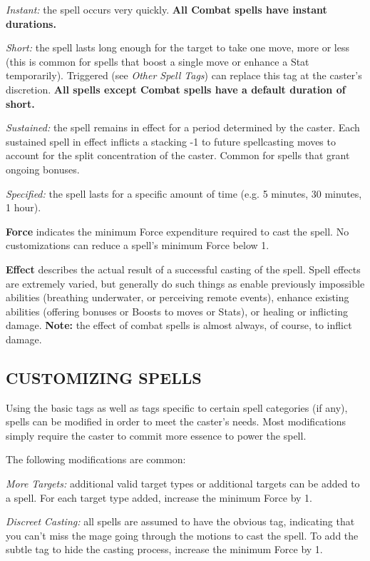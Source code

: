 \documentclass[oneside,10pt]{article}
\begin{document}
\begin{multicols}{2}
\begin{adjustwidth*}{.5cm}{.5cm}
\textit{Instant:} the spell occurs very quickly. \textbf{All Combat spells
have instant durations.}

\textit{Short:} the spell lasts long enough for the target to take one
move, more or less (this is common for spells that boost a
single move or enhance a Stat temporarily). Triggered (see
\textit{Other Spell Tags}) can replace this tag at the caster’s discretion. \textbf{All spells except Combat spells have a default
duration of short.}

\textit{Sustained:} the spell remains in effect for a period determined by the caster. Each sustained spell in effect inflicts a stacking -1 to future spellcasting moves to account for the split concentration of the caster. Common for spells that
grant ongoing bonuses.

\textit{Specified:} the spell lasts for a specific amount of time (e.g.
5 minutes, 30 minutes, 1 hour).
\end{adjustwidth*}
\textbf{Force} indicates the minimum Force expenditure required to cast the spell. No customizations can reduce a
spell’s minimum Force below 1.

\textbf{Effect} describes the actual result of a successful casting of
the spell. Spell effects are extremely varied, but generally do
such things as enable previously impossible abilities (breathing underwater, or perceiving remote events), enhance existing abilities (offering bonuses or Boosts to moves or Stats), or
healing or inflicting damage. \textbf{Note:} the effect of combat spells
is almost always, of course, to inflict damage.

\subsection{CUSTOMIZING SPELLS}
Using the basic tags as well as tags specific to certain spell
categories (if any), spells can be modified in order to meet the
caster’s needs. Most modifications simply require the caster
to commit more essence to power the spell.

The following modifications are common:
\begin{adjustwidth*}{.5cm}{.5cm}

\textit{More Targets:} additional valid target types or additional
targets can be added to a spell. For each target type added, increase the minimum Force by 1.

\textit{Discreet Casting:} all spells are assumed to have the obvious tag, indicating that you can’t miss the mage going
through the motions to cast the spell. To add the subtle tag
to hide the casting process, increase the minimum Force by 1.


\end{adjustwidth*}
\end{multicols}
\end{document}

